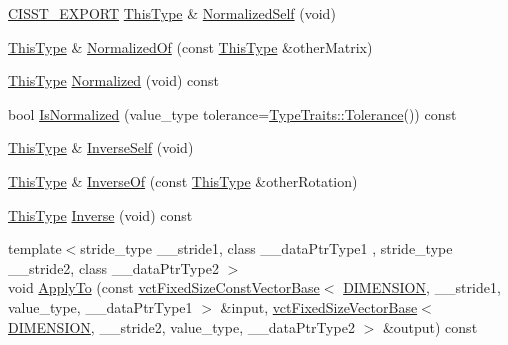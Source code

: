 \begin{DoxyCompactItemize}
\item 
\hyperlink{cmn_export_macros_8h_a99393e0c3ac434b2605235bbe20684f8}{C\+I\+S\+S\+T\+\_\+\+E\+X\+P\+O\+R\+T} \hyperlink{classvct_matrix_rotation2_base_a47ffeef2ddecede4b16bcc88fb432ff5}{This\+Type} \& \hyperlink{classvct_matrix_rotation2_base_a84931c143416b6de688367d23ec91243}{Normalized\+Self} (void)
\item 
\hyperlink{classvct_matrix_rotation2_base_a47ffeef2ddecede4b16bcc88fb432ff5}{This\+Type} \& \hyperlink{classvct_matrix_rotation2_base_a7e348f39bc55162ee27cd8a0d9bf7dc9}{Normalized\+Of} (const \hyperlink{classvct_matrix_rotation2_base_a47ffeef2ddecede4b16bcc88fb432ff5}{This\+Type} \&other\+Matrix)
\item 
\hyperlink{classvct_matrix_rotation2_base_a47ffeef2ddecede4b16bcc88fb432ff5}{This\+Type} \hyperlink{classvct_matrix_rotation2_base_a09dd07b7051b4eb64f9437d82fa666e8}{Normalized} (void) const 
\item 
bool \hyperlink{classvct_matrix_rotation2_base_a197a707b82066472958ee3bc0b4a5998}{Is\+Normalized} (value\+\_\+type tolerance=\hyperlink{classcmn_type_traits_adc129bf9867295b90d300768b780fa99}{Type\+Traits\+::\+Tolerance}()) const 
\item 
\hyperlink{classvct_matrix_rotation2_base_a47ffeef2ddecede4b16bcc88fb432ff5}{This\+Type} \& \hyperlink{classvct_matrix_rotation2_base_a5c173d1356372dbb7de020f5873b17af}{Inverse\+Self} (void)
\item 
\hyperlink{classvct_matrix_rotation2_base_a47ffeef2ddecede4b16bcc88fb432ff5}{This\+Type} \& \hyperlink{classvct_matrix_rotation2_base_a418f25800e076f95a5c5c1ace4958384}{Inverse\+Of} (const \hyperlink{classvct_matrix_rotation2_base_a47ffeef2ddecede4b16bcc88fb432ff5}{This\+Type} \&other\+Rotation)
\item 
\hyperlink{classvct_matrix_rotation2_base_a47ffeef2ddecede4b16bcc88fb432ff5}{This\+Type} \hyperlink{classvct_matrix_rotation2_base_a0e2f782adb2e752ff1a7ae135071824a}{Inverse} (void) const 
\item 
{\footnotesize template$<$stride\+\_\+type \+\_\+\+\_\+stride1, class \+\_\+\+\_\+data\+Ptr\+Type1 , stride\+\_\+type \+\_\+\+\_\+stride2, class \+\_\+\+\_\+data\+Ptr\+Type2 $>$ }\\void \hyperlink{classvct_matrix_rotation2_base_a0be911d69544f855030007185ec2b227}{Apply\+To} (const \hyperlink{classvct_fixed_size_const_vector_base}{vct\+Fixed\+Size\+Const\+Vector\+Base}$<$ \hyperlink{classvct_matrix_rotation2_base_ac10279ed12ec787b1a4833ea02771348acefb9855f54f0cfd782e785c9083e592}{D\+I\+M\+E\+N\+S\+I\+O\+N}, \+\_\+\+\_\+stride1, value\+\_\+type, \+\_\+\+\_\+data\+Ptr\+Type1 $>$ \&input, \hyperlink{classvct_fixed_size_vector_base}{vct\+Fixed\+Size\+Vector\+Base}$<$ \hyperlink{classvct_matrix_rotation2_base_ac10279ed12ec787b1a4833ea02771348acefb9855f54f0cfd782e785c9083e592}{D\+I\+M\+E\+N\+S\+I\+O\+N}, \+\_\+\+\_\+stride2, value\+\_\+type, \+\_\+\+\_\+data\+Ptr\+Type2 $>$ \&output) const 

\end{DoxyCompactItemize}

